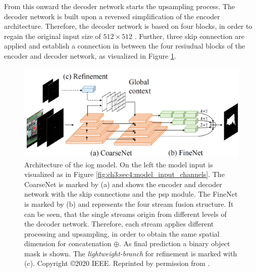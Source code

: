 From this onward the decoder network starts the upsampling process.
The decoder network is built upon a reversed simplification of the encoder architecture. %
Therefore, the decoder network is based on four blocks, in order to regain the original input size of  $512 \times 512$ .
Further, three skip connection are applied and establish a connection in between the four resiudual blocks of the encoder and decoder network, as visualized in Figure \ref{fig:ch3:sec4:arch}.
\begin{figure}
	\includegraphics[width=\linewidth]{figures/chap34_iog_arch.png}
	\caption[IOG Architecture]{		
		Architecture of the \gls{iog} model.
		On the left the model input is visualized as in Figure \ref{fig:ch3:sec4:model_input_channels}.
		The CoarseNet is marked by (a) and shows the encoder and decoder network with the skip connections and the \gls{psp} module.
		The FineNet is marked by (b) and represents the four stream fusion structure.
		It can be seen, that the single streams origin from different levels of the decoder network.
		Therefore, each stream applies different processing and upsampling, in order to obtain the same spatial dimension for concatenation $\oplus$.		
		As final prediction a binary object mask is shown.
		The \textit{lightweight-branch} for refinement is marked with (c).
		Copyright \copyright 2020 IEEE. Reprinted by permission from \cite{Zha20-IOG}.
	}
	\label{fig:ch3:sec4:arch}
\end{figure}

